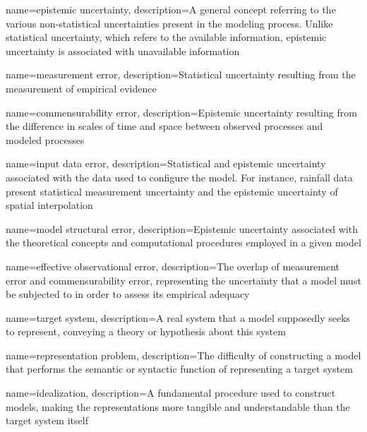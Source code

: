 {
    name=epistemic uncertainty,
    description={A general concept referring to the various non-statistical uncertainties present in the modeling process. Unlike statistical uncertainty, which refers to the available information, epistemic uncertainty is associated with unavailable information}
}

{
    name=measurement error,
    description={Statistical uncertainty resulting from the measurement of empirical evidence}
}

{
    name=commensurability error,
    description={Epistemic uncertainty resulting from the difference in scales of time and space between observed processes and modeled processes}
}

{
    name=input data error,
    description={Statistical and epistemic uncertainty associated with the data used to configure the model. For instance, rainfall data present statistical measurement uncertainty and the epistemic uncertainty of spatial interpolation}
}

{
    name=model structural error,
    description={Epistemic uncertainty associated with the theoretical concepts and computational procedures employed in a given model}
}

{
    name=effective observational error,
    description={The overlap of measurement error and commensurability error, representing the uncertainty that a model must be subjected to in order to assess its empirical adequacy}
}

{
    name=target system,
    description={A real system that a model supposedly seeks to represent, conveying a theory or hypothesis about this system}
}

{
    name=representation problem,
    description={The difficulty of constructing a model that performs the semantic or syntactic function of representing a target system}
}

{
    name=idealization,
    description={A fundamental procedure used to construct models, making the representations more tangible and understandable than the target system itself}
}

